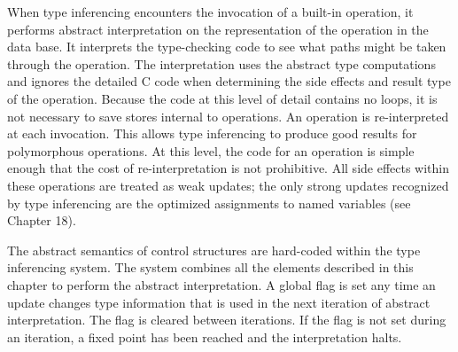 When type inferencing encounters the invocation of a built-in
operation, it performs abstract interpretation on the representation
of the operation in the data base. It interprets the type-checking
code to see what paths might be taken through the operation. The
interpretation uses the abstract type computations and ignores the
detailed C code when determining the side effects and result type of
the operation. Because the code at this level of detail contains no
loops, it is not necessary to save stores internal to operations. An
operation is re-interpreted at each invocation.  This allows type
inferencing to produce good results for polymorphous operations. At
this level, the code for an operation is simple enough that the cost
of re-interpretation is not prohibitive. All side effects within these
operations are treated as weak updates; the only strong updates
recognized by type inferencing are the optimized assignments to named
variables (see Chapter 18).

The abstract semantics of control structures are hard-coded within the
type inferencing system. The system combines all the elements
described in this chapter to perform the abstract interpretation. A
global flag is set any time an update changes type information that is
used in the next iteration of abstract interpretation. The flag is
cleared between iterations. If the flag is not set during an
iteration, a fixed point has been reached and the interpretation
halts.

\bigskip

